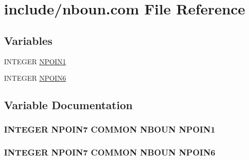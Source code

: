 \hypertarget{nboun_8com}{\section{include/nboun.com File Reference}
\label{nboun_8com}
}
\subsection*{Variables}
\begin{DoxyCompactItemize}
\item 
I\-N\-T\-E\-G\-E\-R \hyperlink{nboun_8com_a16b7b164151edb849dfc519b81b22952}{N\-P\-O\-I\-N1}
\item 
I\-N\-T\-E\-G\-E\-R \hyperlink{nboun_8com_ad5396b70ef7b4f2b539b154ba13a65bf}{N\-P\-O\-I\-N6}
\end{DoxyCompactItemize}


\subsection{Variable Documentation}
\hypertarget{nboun_8com_a16b7b164151edb849dfc519b81b22952}{
\subsubsection[{N\-P\-O\-I\-N1}]{\setlength{\rightskip}{0pt plus 5cm}I\-N\-T\-E\-G\-E\-R N\-P\-O\-I\-N7 C\-O\-M\-M\-O\-N N\-B\-O\-U\-N N\-P\-O\-I\-N1}}\label{nboun_8com_a16b7b164151edb849dfc519b81b22952}
\hypertarget{nboun_8com_ad5396b70ef7b4f2b539b154ba13a65bf}{
\subsubsection[{N\-P\-O\-I\-N6}]{\setlength{\rightskip}{0pt plus 5cm}I\-N\-T\-E\-G\-E\-R N\-P\-O\-I\-N7 C\-O\-M\-M\-O\-N N\-B\-O\-U\-N N\-P\-O\-I\-N6}}\label{nboun_8com_ad5396b70ef7b4f2b539b154ba13a65bf}

